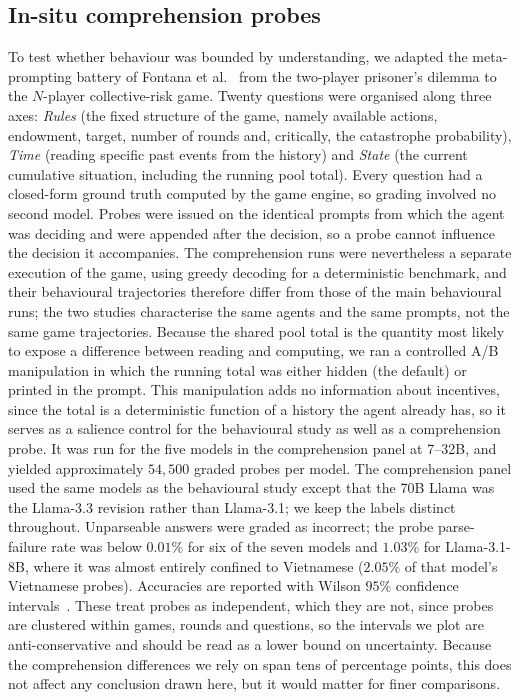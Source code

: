 \documentclass[openacc]{rsproca_new}
\begin{document}
\subsection{In-situ comprehension probes}
To test whether behaviour was bounded by understanding, we adapted the meta-prompting battery of Fontana et al.~\cite{fontana2024nicer} from the two-player prisoner's dilemma to the $N$-player collective-risk game. Twenty questions were organised along three axes: \emph{Rules} (the fixed structure of the game, namely available actions, endowment, target, number of rounds and, critically, the catastrophe probability), \emph{Time} (reading specific past events from the history) and \emph{State} (the current cumulative situation, including the running pool total). Every question had a closed-form ground truth computed by the game engine, so grading involved no second model. Probes were issued on the identical prompts from which the agent was deciding and were appended after the decision, so a probe cannot influence the decision it accompanies. The comprehension runs were nevertheless a separate execution of the game, using greedy decoding for a deterministic benchmark, and their behavioural trajectories therefore differ from those of the main behavioural runs; the two studies characterise the same agents and the same prompts, not the same game trajectories. Because the shared pool total is the quantity most likely to expose a difference between reading and computing, we ran a controlled A/B manipulation in which the running total was either hidden (the default) or printed in the prompt. This manipulation adds no information about incentives, since the total is a deterministic function of a history the agent already has, so it serves as a salience control for the behavioural study as well as a comprehension probe. It was run for the five models in the comprehension panel at 7--32B, and yielded approximately $54{,}500$ graded probes per model. The comprehension panel used the same models as the behavioural study except that the 70B Llama was the Llama-3.3 revision rather than Llama-3.1; we keep the labels distinct throughout. Unparseable answers were graded as incorrect; the probe parse-failure rate was below $0.01\%$ for six of the seven models and $1.03\%$ for Llama-3.1-8B, where it was almost entirely confined to Vietnamese ($2.05\%$ of that model's Vietnamese probes). Accuracies are reported with Wilson $95\%$ confidence intervals~\cite{wilson1927}. These treat probes as independent, which they are not, since probes are clustered within games, rounds and questions, so the intervals we plot are anti-conservative and should be read as a lower bound on uncertainty. Because the comprehension differences we rely on span tens of percentage points, this does not affect any conclusion drawn here, but it would matter for finer comparisons.
\end{document}
